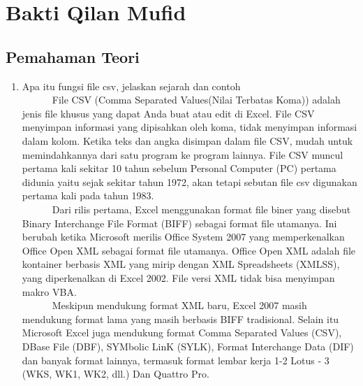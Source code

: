 
\section{Bakti Qilan Mufid}
\subsection{Pemahaman Teori}
\begin{enumerate}
\item Apa itu fungsi file csv, jelaskan sejarah dan contoh\\
\verb|		|File CSV (Comma Separated Values(Nilai Terbatas Koma)) adalah jenis file khusus yang dapat Anda buat atau edit di Excel. File CSV menyimpan informasi yang dipisahkan oleh koma, tidak menyimpan informasi dalam kolom. Ketika teks dan angka disimpan dalam file CSV, mudah untuk memindahkannya dari satu program ke program lainnya. File CSV muncul pertama kali sekitar 10 tahun sebelum Personal Computer (PC) pertama  didunia yaitu sejak sekitar tahun 1972, akan tetapi sebutan file csv digunakan pertama kali pada tahun 1983.\\
\verb|		|Dari rilis pertama, Excel menggunakan format file biner yang disebut Binary Interchange File Format (BIFF) sebagai format file utamanya. Ini berubah ketika Microsoft merilis Office System 2007 yang memperkenalkan Office Open XML sebagai format file utamanya. Office Open XML adalah file kontainer berbasis XML yang mirip dengan XML Spreadsheets (XMLSS), yang diperkenalkan di Excel 2002. File versi XML tidak bisa menyimpan makro VBA.\\
\verb|		|Meskipun mendukung format XML baru, Excel 2007 masih mendukung format lama yang masih berbasis BIFF tradisional. Selain itu Microsoft Excel juga mendukung format Comma Separated Values (CSV), DBase File (DBF), SYMbolic LinK (SYLK), Format Interchange Data (DIF) dan banyak format lainnya, termasuk format lembar kerja 1-2 Lotus - 3 (WKS, WK1, WK2, dll.) Dan Quattro Pro.

\end{enumerate}
